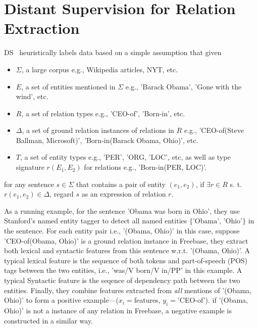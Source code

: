 \documentclass[10pt]{article} %
\theoremstyle{definition}
\theoremstyle{definition}
\begin{document}
\section{Distant Supervision for Relation Extraction}
DS~\cite{mintz} heuristically labels data based on a simple assumption that given 
\begin{itemize}
\item $\Sigma$, a large corpus e.g., Wikipedia articles, NYT, etc. 
\item $E$, a set of entities mentioned in $\Sigma$ e.g., 'Barack Obama', 'Gone with the wind', etc. 
\item $R$, a set of relation types e.g., 'CEO-of', 'Born-in', etc. 
\item $\Delta$, a set of ground relation instances of relations in $R$ e.g., 'CEO-of(Steve Ballman, Microsoft)', 'Born-in(Barack Obama, Ohio)', etc. 
\item $T$, a set of entity types e.g., 'PER', 'ORG, 'LOC', etc, as well as type signature $r(E_1,E_2)$ for relations e.g., 'Born-in(PER, LOC)'. 
\end{itemize}
for any sentence $s\in\Sigma$ that contains a pair of entity $(e_1,e_2)$, if $\exists{}r\in{}R$ s. t. $r(e_1,e_2)\in\Delta$, regard $s$ as an expression of relation $r$. 



As a running example, for the sentence 'Obama was born in Ohio', they use Stanford's named entity tagger to detect all named entities $\{\text{'Obama', 'Ohio'}\}$ in the sentence. 
For each entity pair i.e., '(Obama, Ohio)' in this case, suppose 'CEO-of(Obama, Ohio)' is a ground relation instance in Freebase, they extract both lexical and syntactic features from this sentence w.r.t. '(Obama, Ohio)'. 
A typical lexical feature is the sequence of both tokens and part-of-speech (POS) tags between the two entities, i.e., 'was/V born/V in/PP' in this example. 
A typical Syntactic feature is the seqence of dependency path between the two entities. 
Finally, they combine features extracted from \emph{all} mentions of '(Obama, Ohio)' to form a positive example---($x_{i}=$features, $y_{i}=$'CEO-of'). 
if '(Obama, Ohio)' is not a instance of any relation in Freebase, a negative example is constructed in a similar way. 
\end{document}
